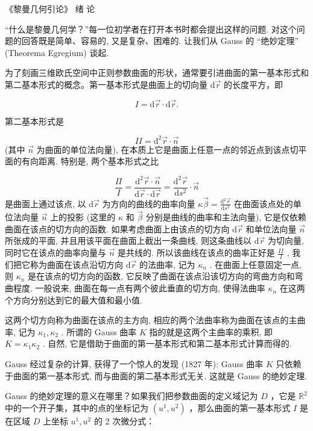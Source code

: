 


 《黎曼几何引论》
 绪 论

“什么是黎曼几何学？”每一位初学者在打开本书时都会提出这样的问题. 对这个问题的回答既是简单、容易的, 又是复杂、困难的. 让我们从 Gauss 的 “绝妙定理” (Theorema Egregium) 谈起.

为了刻画三维欧氏空间中正则参数曲面的形状，通常要引进曲面的第一基本形式和第二基本形式的概念。第一基本形式是曲面上的切向量  $\mathrm{d}\vec{r}$  的长度平方，即

$$
I = \mathrm {d} \vec {r} \cdot \mathrm {d} \vec {r}.
$$

第二基本形式是

$$
I I = \mathrm {d} ^ {2} \vec {r} \cdot \vec {n}
$$
(其中  $\vec{n}$  为曲面的单位法向量), 在本质上它是曲面上任意一点的邻近点到该点切平面的有向距离. 特别是, 两个基本形式之比

$$
\frac {\varPi}{I} = \frac {\mathrm {d} ^ {2} \vec {r} \cdot \vec {n}}{\mathrm {d} \vec {r} \cdot \mathrm {d} \vec {r}} = \frac {\mathrm {d} ^ {2} \vec {r}}{\mathrm {d} s ^ {2}} \cdot \vec {n}
$$
是曲面上通过该点, 以  $\mathrm{d}\vec{r}$  为方向的曲线的曲率向量  $\kappa \vec{\beta} = \frac{\mathrm{d}^2\vec{r}}{\mathrm{d}s^2}$  在曲面该点处的单位法向量  $\vec{n}$  上的投影 (这里的  $\kappa$  和  $\vec{\beta}$  分别是曲线的曲率和主法向量), 它是仅依赖曲面在该点的切方向的函数. 如果考虑曲面上由该点的切方向  $\mathrm{d}\vec{r}$  和单位法向量  $\vec{n}$  所张成的平面, 并且用该平面在曲面上截出一条曲线, 则这条曲线以  $\mathrm{d}\vec{r}$  为切向量, 同时它在该点的曲率向量与  $\vec{n}$  是共线的. 所以该曲线在该点的曲率正好是  $\frac{II}{I}$ , 我们把它称为曲面在该点沿切方向  $\mathrm{d}\vec{r}$  的法曲率, 记为  $\kappa_{n}$ . 在曲面上任意固定一点, 则  $\kappa_{n}$  是在该点的切方向的函数, 它反映了曲面在该点沿该切方向的弯曲方向和弯曲程度. 一般说来, 曲面在每一点有两个彼此垂直的切方向, 使得法曲率  $\kappa_{n}$  在这两个方向分别达到它的最大值和最小值.

这两个切方向称为曲面在该点的主方向, 相应的两个法曲率称为曲面在该点的主曲率, 记为  $\kappa_{1}, \kappa_{2}$ . 所谓的 Gauss 曲率  $K$  指的就是这两个主曲率的乘积, 即  $K = \kappa_{1} \kappa_{2}$ . 自然, 它是借助于曲面的第一基本形式和第二基本形式计算而得的.

Gauss 经过复杂的计算, 获得了一个惊人的发现 (1827 年): Gauss 曲率  $K$  只依赖于曲面的第一基本形式, 而与曲面的第二基本形式无关. 这就是 Gauss 的绝妙定理.

Gauss 的绝妙定理的意义在哪里？如果我们把参数曲面的定义域记为  $D$ ，它是  $\mathbb{R}^2$  中的一个开子集，其中的点的坐标记为  $(u^1, u^2)$ ，那么曲面的第一基本形式  $I$  是在区域  $D$  上坐标  $u^1, u^2$  的 2 次微分式：

